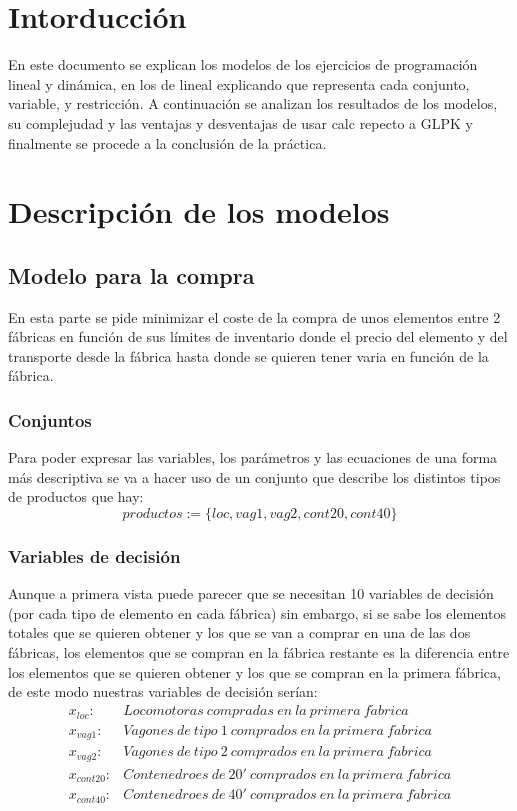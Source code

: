 \documentclass[11pt,spanish]{article}
\begin{document}


	\section{Intorducción}
	En este documento se explican los modelos de los ejercicios de programación lineal y dinámica, en los de lineal explicando que representa cada conjunto, variable, y restricción. A continuación se analizan los resultados de los modelos, su complejudad y las ventajas y desventajas de usar calc repecto a GLPK y finalmente se procede a la conclusión de la práctica.

	\section{Descripción de los modelos}
		\subsection{Modelo para la compra}
			En esta parte se pide minimizar el coste de la compra de unos elementos entre 2 fábricas en función de sus límites de inventario donde el precio del elemento y del transporte desde la fábrica hasta donde se quieren tener varia en función de la fábrica.
			\subsubsection{Conjuntos}
			Para poder expresar las variables, los parámetros y las ecuaciones de una forma más descriptiva se va a hacer uso de un conjunto que describe los distintos tipos de productos que hay:
			$$ productos := \{loc, vag1, vag2, cont20, cont40\} $$
			\subsubsection{Variables de decisión}
			Aunque a primera vista puede parecer que se necesitan 10 variables de decisión (por cada tipo de elemento en cada fábrica) sin embargo, si se sabe los elementos totales que se quieren obtener y los que se van a comprar en una de las dos fábricas, los elementos que se compran en la fábrica restante es la diferencia entre los elementos que se quieren obtener y los que se compran en la primera fábrica, de este modo nuestras variables de decisión serían:
			\begin{align*}
			x_{loc}:& Locomotoras\ compradas\ en\ la\ primera\ f\acute{a}brica \\
			x_{vag1}:& Vagones\ de\ tipo\ 1\ comprados\ en\ la\ primera\ f\acute{a}brica \\
			x_{vag2}:& Vagones\ de\ tipo\ 2\ comprados\ en\ la\ primera\ f\acute{a}brica \\
			x_{cont20}:& Contenedroes\ de\ 20'\ comprados\ en\ la\ primera\ f\acute{a}brica \\
			x_{cont40}:& Contenedroes\ de\ 40'\ comprados\ en\ la\ primera\ f\acute{a}brica 
			\end{align*}
			
\end{document}
